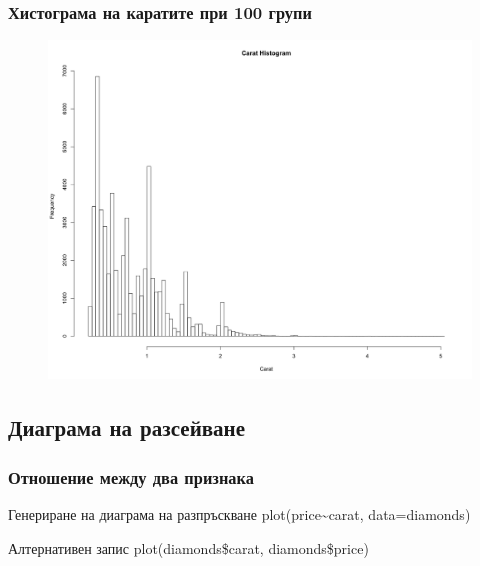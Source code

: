 \documentclass{beamer}
\begin{document}
\begin{frame}
\frametitle{Хистограма на каратите при 100 групи}
\begin{figure}[]\includegraphics[width=\textwidth,height=0.75\textheight]{pic0022}\end{figure}
\end{frame}

\subsection{Диаграма на разсейване}

\begin{frame}
\frametitle{Отношение между два признака}
\begin{block}{Генериране на диаграма на разпръскване}
plot(price\textasciitilde carat, data=diamonds)
\end{block}

\begin{block}{Алтернативен запис}
plot(diamonds\$carat, diamonds\$price)
\end{block}
\end{frame}
\end{document}
